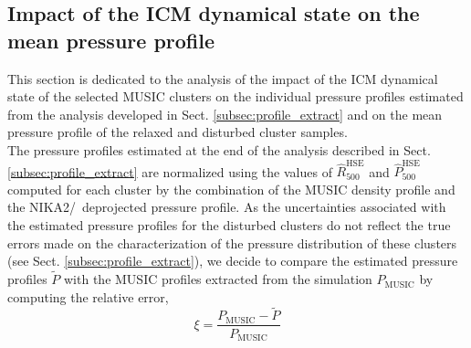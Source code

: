 \documentclass[twocolumn,traditabstract]{aa}
\begin{document}
\subsection{Impact of the ICM dynamical state on the mean pressure profile}\label{subsec:impact_icm_dist}

This section is dedicated to the analysis of the impact of the ICM dynamical state  of the selected MUSIC clusters on the individual pressure profiles estimated from the analysis developed in Sect. \ref{subsec:profile_extract} and on the mean pressure profile of the relaxed and disturbed cluster samples.\\
The pressure profiles estimated at the end of the analysis described in Sect. \ref{subsec:profile_extract} are normalized using the values of $\hat{R}_{500}^{\mathrm{HSE}}$ and $\hat{P}_{500}^{\mathrm{HSE}}$ computed for each cluster by the combination of the MUSIC density profile and the NIKA2/\planck\ deprojected pressure profile. As the uncertainties associated with the estimated pressure profiles for the disturbed clusters do not reflect the true errors made on the characterization of the pressure distribution of these clusters (see Sect. \ref{subsec:profile_extract}), we decide to compare the estimated pressure profiles $\tilde{P}$ with the MUSIC profiles extracted from the simulation $P_{\mathrm{MUSIC}}$ by computing the relative error,
\begin{equation}
\xi = \frac{P_{\mathrm{MUSIC}} - \tilde{P}}{P_{\mathrm{MUSIC}}}
\end{equation}
\end{document}
